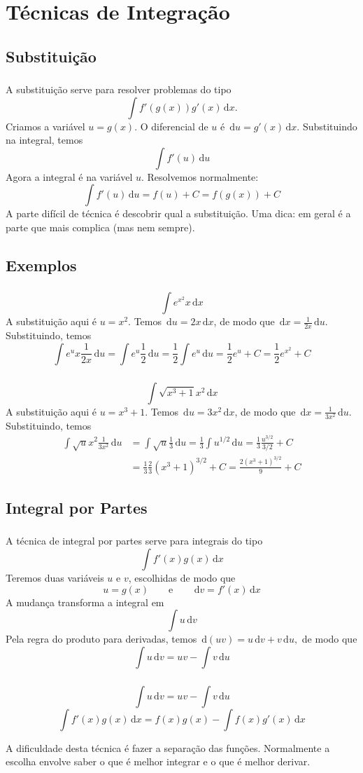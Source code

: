 \documentclass[10 pt]{beamer}
\newcommand{\makesection}[1]{\section[#1]{#1}}
\newcommand{\makesubsection}[1]{\subsection[#1]{#1}}
\newcommand{\dif}{\,\mathrm{d}}
\newcommand{\myframe}[1]{
\begin{frame}
 \frametitle{\insertsection \qquad {\small \insertsubsection}}
#1
\end{frame}}
\begin{document}
\makesection{Técnicas de Integração}
\makesubsection{Substituição}

\myframe{
  A substituição serve para resolver problemas do tipo
  $$ \int\!f'(g(x))g'(x)\dif x. $$
  Criamos a variável $u = g(x)$. O diferencial de $u$ é $\dif u = g'(x)\dif x$.
  Substituindo na integral, temos
  $$ \int\!f'(u)\dif u $$
  Agora a integral é na variável $u$. Resolvemos normalmente:
  $$ \int\!f'(u)\dif u = f(u) + C = f(g(x)) + C$$
  A parte difícil de técnica é descobrir qual a substituição. Uma dica:
  em geral é a parte que mais complica (mas nem sempre).
}

\makesubsection{Exemplos}

\myframe{
  $$ \int\!e^{x^2}x\dif x $$
  A substituição aqui é $u = x^2$. Temos $\dif u = 2x\dif x$, de
  modo que $\dif x = \frac{1}{2x}\dif u$.
  Substituindo, temos
  $$ \int\!e^ux\frac{1}{2x}\dif u = \int\!e^u\frac{1}{2}\dif u 
    = \frac{1}{2}\int\!e^u\dif u = \frac{1}{2}e^u + C 
    = \frac{1}{2}e^{x^2} + C$$
}

\myframe{
  $$ \int\!\sqrt{x^3+1}x^2\dif x $$
  A substituição aqui é $u = x^3 + 1$. Temos
  $\dif u = 3x^2\dif x$, de modo que $\dif x = \frac{1}{3x^2}\dif u$.
  Substituindo, temos
  \begin{align*}
    \int\!\sqrt{u}x^2\frac{1}{3x^2}\dif u & =
    \int\!\sqrt{u}\frac{1}{3}\dif u =
    \frac{1}{3}\int\!u^{1/2}\dif u =
    \frac{1}{3}\frac{u^{3/2}}{3/2} + C \\ 
    & = \frac{1}{3}\frac{2}{3}(x^3+1)^{3/2} + C
    = \frac{2(x^3 + 1)^{3/2}}{9} + C
  \end{align*}
}

\makesubsection{Integral por Partes}

\myframe{
  A técnica de integral por partes serve para integrais
  do tipo
  $$ \int\!f'(x)g(x)\dif x $$
  Teremos duas variáveis $u$ e $v$, escolhidas
  de modo que
  $$ u = g(x) \qquad \mbox{e} 
    \qquad \dif v = f'(x)\dif x $$
  A mudança transforma a integral em
  $$ \int\!u\dif v $$
  Pela regra do produto para derivadas, temos
  $ \dif(uv) = u\dif v + v\dif u, $
  de modo que
  $$ \int\!u\dif v = uv - \int\!v\dif u $$
}

\myframe {
  $$ \int\!u\dif v = uv - \int\!v\dif u $$
  $$ \int\!f'(x)g(x)\dif x = f(x)g(x) 
    - \int\!f(x)g'(x)\dif x $$

  A dificuldade desta técnica é fazer a separação
  das funções. Normalmente a escolha envolve saber
  o que é melhor integrar e o que é melhor derivar.
}
\end{document}
